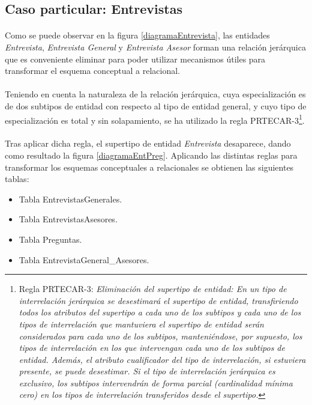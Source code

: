 \subsection{Caso particular: Entrevistas}

  \paragraph{}Como se puede observar en la figura \ref{diagramaEntrevista}, las
  entidades \textit{Entrevista}, \textit{Entrevista General} y
  \textit{Entrevista Asesor} forman una relación jerárquica que es
  conveniente eliminar para poder utilizar mecanismos útiles para transformar el
  esquema conceptual a relacional.

  \paragraph{}Teniendo en cuenta la naturaleza de la relación jerárquica, cuya
  especialización es de dos subtipos de entidad con respecto al tipo de entidad
  general, y cuyo tipo de especialización es total y sin solapamiento, se ha
  utilizado la regla PRTECAR-3\footnote{Regla PRTECAR-3: \textit{Eliminación del
  supertipo de entidad: En un tipo de interrelación jerárquica se desestimará el
  supertipo de entidad, transfiriendo todos los atributos del supertipo a cada
  uno de los subtipos y cada uno de los tipos de interrelación que mantuviera el
  supertipo de entidad serán considerados para cada uno de los subtipos,
  manteniéndose, por supuesto, los tipos de interrelación en los que intervengan
  cada uno de los subtipos de entidad. Además, el atributo cualificador del tipo
  de interrelación, si estuviera presente, se puede desestimar. Si el tipo de
  interrelación jerárquica es exclusivo, los subtipos intervendrán de forma
  parcial (cardinalidad mínima cero) en los tipos de interrelación transferidos
  desde el supertipo.}}.

  \paragraph{}Tras aplicar dicha regla, el supertipo de entidad
  \textit{Entrevista} desaparece, dando como resultado la figura
  \ref{diagramaEntPreg}. Aplicando las distintas reglas para transformar los
  esquemas conceptuales a relacionales se obtienen las siguientes tablas:

  \begin{itemize}
    \item Tabla EntrevistasGenerales.
    \item Tabla EntrevistasAsesores.
    \item Tabla Preguntas.
    \item Tabla EntrevistaGeneral\_Asesores.
  \end{itemize}

